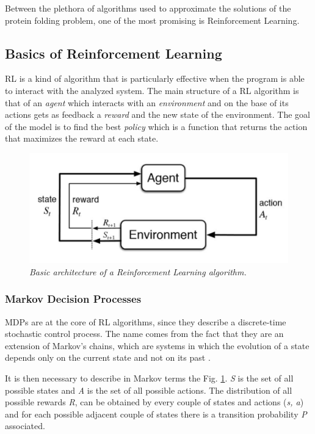 Between the plethora of algorithms used to approximate the solutions of the protein folding problem, one of the most promising is Reinforcement Learning.

\subsection{Basics of Reinforcement Learning} \label{BRL}

RL is a kind of algorithm that is particularly effective when the program is able to interact with the analyzed system.
The main structure of a RL algorithm is that of an \emph{agent} which interacts with an \emph{environment} and on the base of its actions gets as feedback a \emph{reward} and the new state of the environment.
The goal of the model is to find the best \emph{policy} which is a function that returns the action that maximizes the reward at each state.


\begin{figure}[H]
    \centering
    \includegraphics[width=.75\textwidth]{img/rl0.png}
    \caption{\emph{Basic architecture of a Reinforcement Learning algorithm.}}
    \label{fig:rl0}
\end{figure}

\subsubsection{Markov Decision Processes}

MDPs are at the core of RL algorithms, since they describe a discrete-time stochastic control process.
The name comes from the fact that they are an extension of Markov's chains, which are systems in which the evolution of a state depends only on the current state and not on its past \cite{bellman1957markovian}.


It is then necessary to describe in Markov terms the Fig. \ref{fig:rl0}.
\emph{S} is the set of all possible states and \emph{A} is the set of all possible actions.
The distribution of all possible rewards \emph{R}, can be obtained by every couple of states and actions (\emph{s, a}) and for each possible adjacent couple of states there is a transition probability \emph{P} associated.

